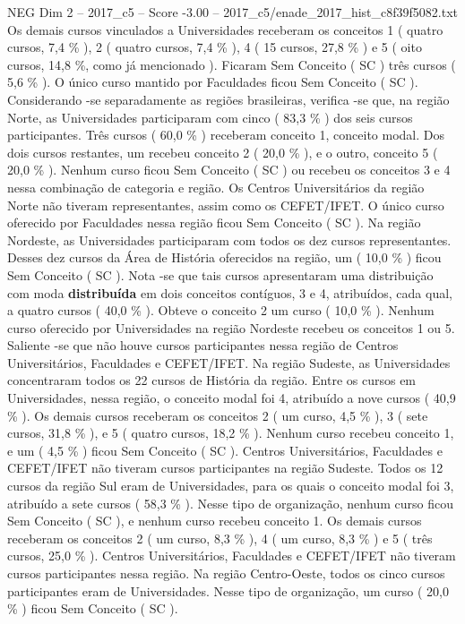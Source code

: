 \begin{textsample}{NEG Dim 2 – 2017\_c5 – Score -3.00 – 2017\_c5/enade\_2017\_hist\_c8f39f5082.txt}
Os demais cursos vinculados a Universidades receberam os conceitos 1 ( quatro cursos, 7,4 \% ), 2 ( quatro cursos, 7,4 \% ), 4 ( 15 cursos, 27,8 \% ) e 5 ( oito cursos, 14,8 \%, como já mencionado ).
Ficaram Sem Conceito ( SC ) três cursos ( 5,6 \% ).
O único curso mantido por Faculdades ficou Sem Conceito ( SC ).
Considerando -se separadamente as regiões brasileiras, verifica -se que, na região Norte, as Universidades participaram com cinco ( 83,3 \% ) dos seis cursos participantes.
Três cursos ( 60,0 \% ) receberam conceito 1, conceito modal.
Dos dois cursos restantes, um recebeu conceito 2 ( 20,0 \% ), e o outro, conceito 5 ( 20,0 \% ).
Nenhum curso ficou Sem Conceito ( SC ) ou recebeu os conceitos 3 e 4 nessa combinação de categoria e região.
Os Centros Universitários da região Norte não tiveram representantes, assim como os CEFET/IFET.
O único curso oferecido por Faculdades nessa região ficou Sem Conceito ( SC ).
Na região Nordeste, as Universidades participaram com todos os dez cursos representantes.
Desses dez cursos da Área de História oferecidos na região, um ( 10,0 \% ) ficou Sem Conceito ( SC ).
Nota -se que tais cursos apresentaram uma distribuição com moda \textbf{distribuída} em dois conceitos contíguos, 3 e 4, atribuídos, cada qual, a quatro cursos ( 40,0 \% ).
Obteve o conceito 2 um curso ( 10,0 \% ).
Nenhum curso oferecido por Universidades na região Nordeste recebeu os conceitos 1 ou 5.
Saliente -se que não houve cursos participantes nessa região de Centros Universitários, Faculdades e CEFET/IFET.
Na região Sudeste, as Universidades concentraram todos os 22 cursos de História da região.
Entre os cursos em Universidades, nessa região, o conceito modal foi 4, atribuído a nove cursos ( 40,9 \% ).
Os demais cursos receberam os conceitos 2 ( um curso, 4,5 \% ), 3 ( sete cursos, 31,8 \% ), e 5 ( quatro cursos, 18,2 \% ).
Nenhum curso recebeu conceito 1, e um ( 4,5 \% ) ficou Sem Conceito ( SC ).
Centros Universitários, Faculdades e CEFET/IFET não tiveram cursos participantes na região Sudeste.
Todos os 12 cursos da região Sul eram de Universidades, para os quais o conceito modal foi 3, atribuído a sete cursos ( 58,3 \% ).
Nesse tipo de organização, nenhum curso ficou Sem Conceito ( SC ), e nenhum curso recebeu conceito 1.
Os demais cursos receberam os conceitos 2 ( um curso, 8,3 \% ), 4 ( um curso, 8,3 \% ) e 5 ( três cursos, 25,0 \% ).
Centros Universitários, Faculdades e CEFET/IFET não tiveram cursos participantes nessa região.
Na região Centro-Oeste, todos os cinco cursos participantes eram de Universidades.
Nesse tipo de organização, um curso ( 20,0 \% ) ficou Sem Conceito ( SC ).

\end{textsample}
